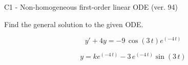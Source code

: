 \begin{exercise}
  \begin{exerciseTitle}C1 - Non-homogeneous first-order linear ODE (ver. 94)\end{exerciseTitle}
  \begin{exerciseStatement}
    
Find the general solution to the given ODE.

    
\[y'+4y= -9 \, \cos\left(3 \, t\right) e^{\left(-4 \, t\right)}\]

  \end{exerciseStatement}
  \begin{exerciseAnswer}
    
\[y= k e^{\left(-4 \, t\right)} - 3 \, e^{\left(-4 \, t\right)} \sin\left(3 \, t\right)\]

  \end{exerciseAnswer}
\end{exercise}